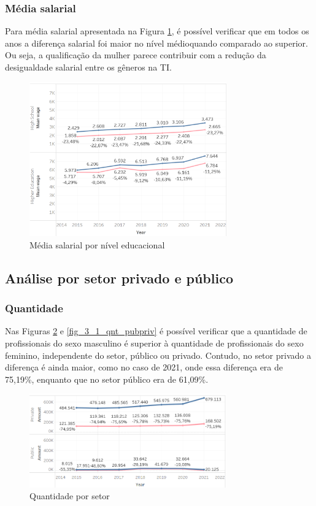 \subsubsection{Média salarial}

Para média salarial apresentada na Figura \ref{fig_2_sal_educ}, é possível verificar que em todos os anos a diferença salarial foi maior no nível médioquando comparado ao superior. Ou seja, a qualificação da mulher parece contribuir com a redução da desigualdade salarial entre os gêneros na TI.

\begin{figure}[htbp]
	\centerline{
		\includegraphics[width=85mm]{assets/2_sal_educ.PNG}
	}
	\caption{Média salarial por nível educacional}
	\label{fig_2_sal_educ}
\end{figure}

\subsection{Análise por setor privado e público}  \label{sub:privpub}

\subsubsection{Quantidade}

Nas Figuras \ref{fig_3_qnt_pubpriv} e \ref{fig_3_1_qnt_pubpriv} é possível verificar que a quantidade de profissionais do sexo masculino é superior à quantidade de profissionais do sexo feminino, independente do setor, público ou privado. Contudo, no setor privado a diferença é ainda maior, como no caso de 2021, onde essa diferença era de 75,19\%, enquanto que no setor público era de 61,09\%.

\begin{figure}[htbp]
	\centerline{
		\includegraphics[width=85mm]{assets/3_qnt_pubpriv.PNG}
	}
	\caption{Quantidade por setor}
	\label{fig_3_qnt_pubpriv}
\end{figure}


